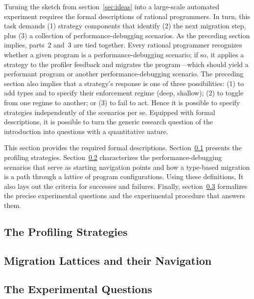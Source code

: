 
Turning the sketch from section~\ref{sec:ideas} into a large-scale automated
experiment requires the formal descriptions of rational programmers. In turn,
this task demands (1) strategy components that identify (2) the next migration
step, plus (3) a collection of performance-debugging scenarios. As the preceding
section implies, parts~2 and~3 are tied together. Every rational programmer
recognizes whether a given program is a performance-debugging scenario; if so,
it applies a strategy to the profiler feedback and migrates the program---which
should yield a performant program or another performance-debugging scenario.
The preceding section also implies that a strategy's response is one of three
possibilities:  (1) to add types and to specify their
enforcement regime (deep, shallow); (2) to toggle from one regime to
another; or (3) to fail to act. Hence it is possible to specify strategies independently of the
scenarios per se. Equipped with formal descriptions, it is possible to turn the
generic research question of the introduction into questions with a quantitative
nature.

This section provides the required formal descriptions.
Section~\ref{subsec:strategies} presents the profiling strategies.
Section~\ref{subsec:lattice} characterizes the performance-debugging scenarios
that serve as starting navigation points and how a type-based migration is a
path through a lattice of program configurations. Using these definitions, It
also lays out the criteria for successes and failures. Finally,
section~\ref{subsec:questions} formalizes the precise experimental questions and
the experimental procedure that answers them.


\def\exp#1#2{\subsection{#2} \label{subsec:#1} }

\exp{strategies}{The Profiling Strategies}
\exp{lattice}{Migration Lattices and their Navigation}
\exp{questions}{The Experimental Questions}
